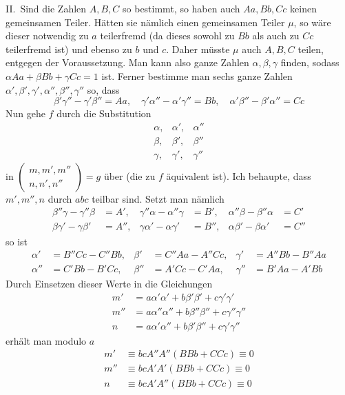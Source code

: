 II.\ Sind die Zahlen \(A,B,C\) so bestimmt, so haben auch \(Aa,Bb,Cc\)
keinen gemeinsamen Teiler. Hätten sie nämlich einen gemeinsamen
Teiler \(\mu\), so wäre dieser notwendig zu \(a\) teilerfremd
(da dieses sowohl zu \(Bb\) als auch zu \(Cc\) teilerfremd ist)
und ebenso zu
\(b\) und \(c\). Daher müsste \(\mu\) auch \(A,B,C\) teilen,
entgegen der Voraussetzung. Man kann also ganze Zahlen \(\alpha,\beta,\gamma\)
finden, sodass \(\alpha Aa+\beta Bb+\gamma Cc=1\) ist. Ferner bestimme man sechs ganze
Zahlen \(\alpha',\beta',\gamma',\alpha'',\beta'',\gamma''\) so, dass
\[
\beta'\gamma''-\gamma'\beta''=Aa,\quad
\gamma'\alpha''-\alpha'\gamma''=Bb,\quad
\alpha'\beta''-\beta'\alpha''=Cc
\]
Nun gehe \(f\) durch die Substitution
\[
\begin{array}{ccc}
\alpha,&\alpha',&\alpha''\\
\beta,&\beta',&\beta''\\
\gamma,&\gamma',&\gamma''
\end{array}
\]
in \(\left(\begin{smallmatrix}m,m',m''\\n,n',n''\end{smallmatrix}\right)=g\) über (die zu \(f\) äquivalent ist). Ich behaupte,
dass \(m',m'',n\) durch \(abc\) teilbar sind. Setzt man nämlich
\[
\begin{aligned}
\beta''\gamma-\gamma''\beta&=A',&\gamma''\alpha-\alpha''\gamma&=B',&\alpha''\beta-\beta''\alpha&=C'\\
\beta\gamma'-\gamma\beta'&=A'',&\gamma\alpha'-\alpha\gamma'&=B'',&\alpha\beta'-\beta\alpha'&=C''
\end{aligned}
\]
so ist
\[
\begin{aligned}
\alpha'&=B''Cc-C''Bb,&\beta'&=C''Aa-A''Cc,&\gamma'&=A''Bb-B''Aa\\
\alpha''&=C'Bb-B'Cc,&\beta''&=A'Cc-C'Aa,&\gamma''&=B'Aa-A'Bb
\end{aligned}
\]
Durch Einsetzen dieser Werte in die Gleichungen
\[
\begin{aligned}
m'&=a\alpha'\alpha'+b\beta'\beta'+c\gamma'\gamma'\\
m''&=a\alpha''\alpha''+b\beta''\beta''+c\gamma''\gamma''\\
n&=a\alpha'\alpha''+b\beta'\beta''+c\gamma'\gamma''
\end{aligned}
\]
erhält man modulo \(a\)
\[
\begin{aligned}
m'&\equiv bcA''A''(BBb+CCc)\equiv0\\
m''&\equiv bcA'A'(BBb+CCc)\equiv0\\
n&\equiv bcA'A''(BBb+CCc)\equiv0
\end{aligned}
\]
